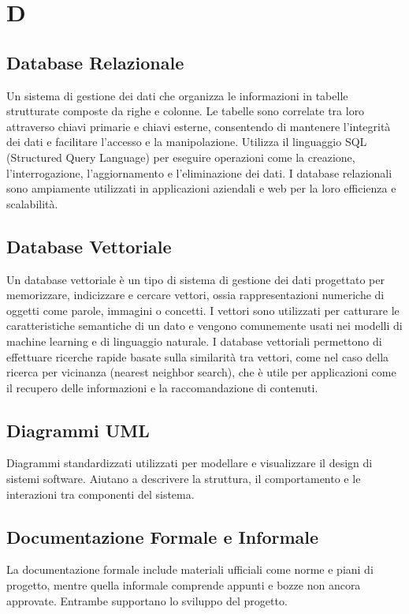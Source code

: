 \documentclass{article}
\begin{document}
\newpage

\section{D}

\subsection{Database Relazionale}
Un sistema di gestione dei dati che organizza le informazioni in tabelle strutturate composte da righe e colonne. Le tabelle sono correlate tra loro attraverso chiavi primarie e chiavi esterne, consentendo di mantenere l'integrità dei dati e facilitare l'accesso e la manipolazione. Utilizza il linguaggio SQL (Structured Query Language) per eseguire operazioni come la creazione, l'interrogazione, l'aggiornamento e l'eliminazione dei dati. I database relazionali sono ampiamente utilizzati in applicazioni aziendali e web per la loro efficienza e scalabilità.

\subsection{Database Vettoriale}
Un database vettoriale è un tipo di sistema di gestione dei dati progettato per memorizzare, indicizzare e cercare vettori, ossia rappresentazioni numeriche di oggetti come parole, immagini o concetti. I vettori sono utilizzati per catturare le caratteristiche semantiche di un dato e vengono comunemente usati nei modelli di machine learning e di linguaggio naturale. I database vettoriali permettono di effettuare ricerche rapide basate sulla similarità tra vettori, come nel caso della ricerca per vicinanza (nearest neighbor search), che è utile per applicazioni come il recupero delle informazioni e la raccomandazione di contenuti.

\subsection{Diagrammi UML}
Diagrammi standardizzati utilizzati per modellare e visualizzare il design di sistemi software. Aiutano a descrivere la struttura, il comportamento e le interazioni tra componenti del sistema.

\subsection{Documentazione Formale e Informale}
La documentazione formale include materiali ufficiali come norme e piani di progetto, mentre quella informale comprende appunti e bozze non ancora approvate. Entrambe supportano lo sviluppo del progetto.
\end{document}
